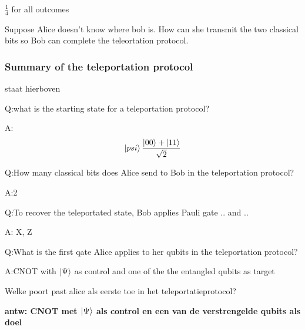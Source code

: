 \documentclass[a4paper, addpoints, 12pt
    , answers    %
    ]{exam}
\begin{document}
\begin{questions}
$\tfrac{1}{4}$ for all outcomes

Suppose Alice doesn't know where bob is. How can she transmit the two classical bits so Bob can complete the teleortation protocol.

\subsubsection*{Summary of the teleportation protocol}
staat hierboven 

Q:what is the starting state for a teleportation protocol?

A:$$\ket{\\psi}\frac{\ket{00}+\ket{11}}{\sqrt{2}}$$

Q:How many classical bits does Alice send to Bob in the teleportation protocol?

A:2

Q:To recover the teleportated state, Bob applies Pauli gate .. and ..

A: X, Z

Q:What is the first qate Alice applies to her qubits in the teleportation protocol?

A:CNOT with $\ket{\Psi}$ as control and one of the the entangled qubits as target 

\question[1]
Welke poort past alice als eerste toe in het teleportatieprotocol?

\ifprintanswers
\textbf{antw:
CNOT met $\ket{\Psi}$ als control en een van de verstrengelde qubits als doel 
}
\else
\fillwithlines{.5in}
\fi


\end{questions}
\end{document}
